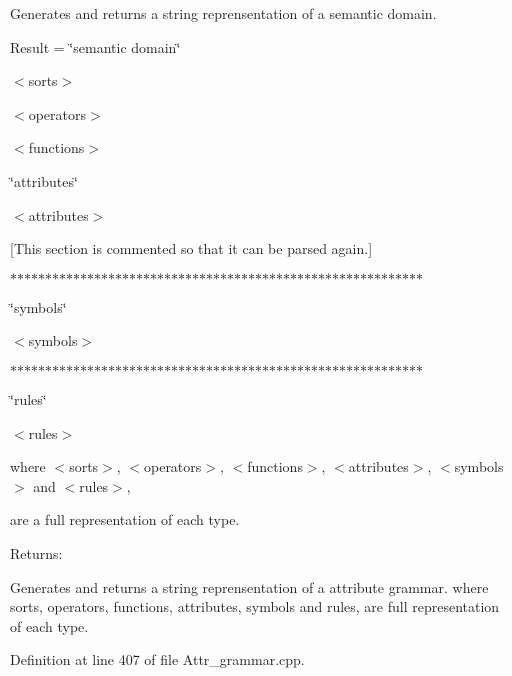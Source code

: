 Generates and returns a string reprensentation of a semantic domain.\par
 \par
 Result = \char`\"{}semantic domain\char`\"{}\par
 $<$sorts$>$\par
 $<$operators$>$\par
 $<$functions$>$\par
 \par
 \char`\"{}attributes\char`\"{}\par
 $<$attributes$>$\par
 \par
 \mbox{[}This section is commented so that it can be parsed again.\mbox{]}\par
 $\ast$$\ast$$\ast$$\ast$$\ast$$\ast$$\ast$$\ast$$\ast$$\ast$$\ast$$\ast$$\ast$$\ast$$\ast$$\ast$$\ast$$\ast$$\ast$$\ast$$\ast$$\ast$$\ast$$\ast$$\ast$$\ast$$\ast$$\ast$$\ast$$\ast$$\ast$$\ast$$\ast$$\ast$$\ast$$\ast$$\ast$$\ast$$\ast$$\ast$$\ast$$\ast$$\ast$$\ast$$\ast$$\ast$$\ast$$\ast$$\ast$$\ast$$\ast$$\ast$$\ast$$\ast$$\ast$$\ast$$\ast$$\ast$$\ast$\par
 \char`\"{}symbols\char`\"{}\par
 $<$symbols$>$\par
 $\ast$$\ast$$\ast$$\ast$$\ast$$\ast$$\ast$$\ast$$\ast$$\ast$$\ast$$\ast$$\ast$$\ast$$\ast$$\ast$$\ast$$\ast$$\ast$$\ast$$\ast$$\ast$$\ast$$\ast$$\ast$$\ast$$\ast$$\ast$$\ast$$\ast$$\ast$$\ast$$\ast$$\ast$$\ast$$\ast$$\ast$$\ast$$\ast$$\ast$$\ast$$\ast$$\ast$$\ast$$\ast$$\ast$$\ast$$\ast$$\ast$$\ast$$\ast$$\ast$$\ast$$\ast$$\ast$$\ast$$\ast$$\ast$$\ast$\par
 \char`\"{}rules\char`\"{}\par
 $<$rules$>$\par
 \par
 where $<$sorts$>$, $<$operators$>$, $<$functions$>$, $<$attributes$>$, $<$symbols$>$ and $<$rules$>$,\par
 are a full representation of each type.\par


\begin{Desc}
\item[Returns:]\end{Desc}
Generates and returns a string reprensentation of a attribute grammar. where sorts, operators, functions, attributes, symbols and rules, are full representation of each type. 

Definition at line 407 of file Attr\_\-grammar.cpp.

